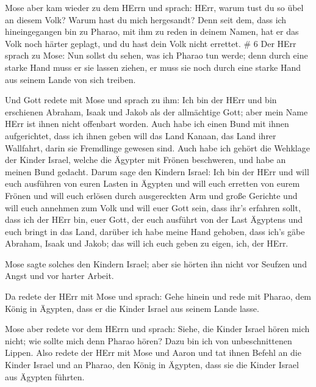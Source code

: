  Mose aber kam wieder zu dem HErrn und sprach: HErr, warum
tust du so übel an diesem Volk? Warum hast du mich hergesandt?
 Denn seit dem, dass ich hineingegangen bin zu Pharao, mit
ihm zu reden in deinem Namen, hat er das Volk noch härter geplagt, und
du hast dein Volk nicht errettet. \# 6  Der HErr sprach zu
Mose: Nun sollst du sehen, was ich Pharao tun werde; denn durch eine
starke Hand muss er sie lassen ziehen, er muss sie noch durch eine
starke Hand aus seinem Lande von sich treiben.

 Und Gott redete mit Mose und sprach zu ihm: Ich bin der
HErr  und bin erschienen Abraham, Isaak und Jakob als der
allmächtige Gott; aber mein Name HErr ist ihnen nicht offenbart worden.
 Auch habe ich einen Bund mit ihnen aufgerichtet, dass ich
ihnen geben will das Land Kanaan, das Land ihrer Wallfahrt, darin sie
Fremdlinge gewesen sind.  Auch habe ich gehört die Wehklage
der Kinder Israel, welche die Ägypter mit Frönen beschweren, und habe an
meinen Bund gedacht.  Darum sage den Kindern Israel: Ich bin
der HErr und will euch ausführen von euren Lasten in Ägypten und will
euch erretten von eurem Frönen und will euch erlösen durch ausgereckten
Arm und große Gerichte  und will euch annehmen zum Volk und
will euer Gott sein, dass ihr's erfahren sollt, dass ich der HErr bin,
euer Gott, der euch ausführt von der Last Ägyptens  und euch
bringt in das Land, darüber ich habe meine Hand gehoben, dass ich's gäbe
Abraham, Isaak und Jakob; das will ich euch geben zu eigen, ich, der
HErr.

 Mose sagte solches den Kindern Israel; aber sie hörten ihn
nicht vor Seufzen und Angst und vor harter Arbeit.

 Da redete der HErr mit Mose und sprach:  Gehe
hinein und rede mit Pharao, dem König in Ägypten, dass er die Kinder
Israel aus seinem Lande lasse.

 Mose aber redete vor dem HErrn und sprach: Siehe, die
Kinder Israel hören mich nicht; wie sollte mich denn Pharao hören? Dazu
bin ich von unbeschnittenen Lippen.  Also redete der HErr
mit Mose und Aaron und tat ihnen Befehl an die Kinder Israel und an
Pharao, den König in Ägypten, dass sie die Kinder Israel aus Ägypten
führten.


